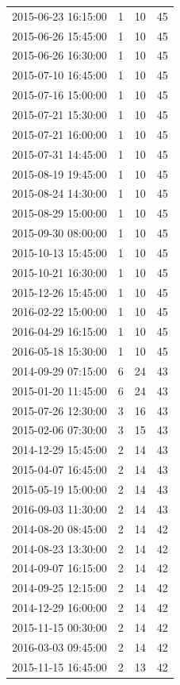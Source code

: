 \begin{tabular}{lrrr}
2015-06-23 16:15:00 & 1 & 10 & 45 \\
2015-06-26 15:45:00 & 1 & 10 & 45 \\
2015-06-26 16:30:00 & 1 & 10 & 45 \\
2015-07-10 16:45:00 & 1 & 10 & 45 \\
2015-07-16 15:00:00 & 1 & 10 & 45 \\
2015-07-21 15:30:00 & 1 & 10 & 45 \\
2015-07-21 16:00:00 & 1 & 10 & 45 \\
2015-07-31 14:45:00 & 1 & 10 & 45 \\
2015-08-19 19:45:00 & 1 & 10 & 45 \\
2015-08-24 14:30:00 & 1 & 10 & 45 \\
2015-08-29 15:00:00 & 1 & 10 & 45 \\
2015-09-30 08:00:00 & 1 & 10 & 45 \\
2015-10-13 15:45:00 & 1 & 10 & 45 \\
2015-10-21 16:30:00 & 1 & 10 & 45 \\
2015-12-26 15:45:00 & 1 & 10 & 45 \\
2016-02-22 15:00:00 & 1 & 10 & 45 \\
2016-04-29 16:15:00 & 1 & 10 & 45 \\
2016-05-18 15:30:00 & 1 & 10 & 45 \\
2014-09-29 07:15:00 & 6 & 24 & 43 \\
2015-01-20 11:45:00 & 6 & 24 & 43 \\
2015-07-26 12:30:00 & 3 & 16 & 43 \\
2015-02-06 07:30:00 & 3 & 15 & 43 \\
2014-12-29 15:45:00 & 2 & 14 & 43 \\
2015-04-07 16:45:00 & 2 & 14 & 43 \\
2015-05-19 15:00:00 & 2 & 14 & 43 \\
2016-09-03 11:30:00 & 2 & 14 & 43 \\
2014-08-20 08:45:00 & 2 & 14 & 42 \\
2014-08-23 13:30:00 & 2 & 14 & 42 \\
2014-09-07 16:15:00 & 2 & 14 & 42 \\
2014-09-25 12:15:00 & 2 & 14 & 42 \\
2014-12-29 16:00:00 & 2 & 14 & 42 \\
2015-11-15 00:30:00 & 2 & 14 & 42 \\
2016-03-03 09:45:00 & 2 & 14 & 42 \\
2015-11-15 16:45:00 & 2 & 13 & 42 \\

\end{tabular}
